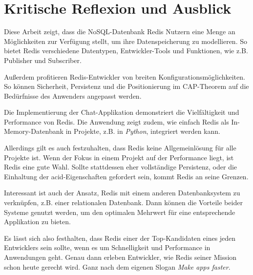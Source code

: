 
\chapter{Kritische Reflexion und Ausblick}

Diese Arbeit zeigt, dass die \ac{NoSQL-Datenbank} \ac{Redis} Nutzern eine Menge an Möglichkeiten zur Verfügung stellt, um ihre Datenspeicherung zu modellieren. So bietet \ac{Redis} verschiedene Datentypen, Entwickler-Tools und Funktionen, wie z.B. Publisher und Subscriber. 

Außerdem profitieren \ac{Redis}-Entwickler von breiten Konfigurationsmöglichkeiten. So können Sicherheit, Persistenz und die Positionierung im \ac{CAP}-Theorem auf die Bedürfnisse des Anwenders angepasst werden.

Die Implementierung der Chat-Applikation demonstriert die Vielfältigkeit und Performance von \ac{Redis}. Die Anwendung zeigt zudem, wie einfach \ac{Redis} als In-Memory-Datenbank in Projekte, z.B. in \textit{Python}, integriert werden kann.

Allerdings gilt es auch festzuhalten, dass \ac{Redis} keine Allgemeinlösung für alle Projekte ist. Wenn der Fokus in einem Projekt auf der Performance liegt, ist \ac{Redis} eine gute Wahl. Sollte stattdessen eher vollständige Persistenz, oder die Einhaltung der \gls{acid}-Eigenschaften gefordert sein, kommt \ac{Redis} an seine Grenzen. 

Interessant ist auch der Ansatz, \ac{Redis} mit einem anderen Datenbanksystem zu verknüpfen, z.B. einer relationalen Datenbank. Dann können die Vorteile beider Systeme genutzt werden, um den optimalen Mehrwert für eine entsprechende Applikation zu bieten. 

Es lässt sich also festhalten, dass \ac{Redis} einer der Top-Kandidaten eines jeden Entwicklers sein sollte, wenn es um Schnelligkeit und Performance in Anwendungen geht. Genau dann erleben Entwickler, wie \ac{Redis} seiner Mission schon heute gerecht wird. Ganz nach dem eigenen Slogan \glqq \textit{Make apps faster}\grqq .